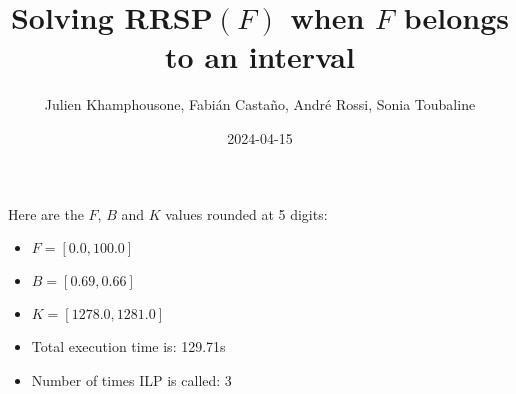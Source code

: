 \documentclass{article}
\begin{document}
     \title{Solving RRSP$(F)$ when $F$ belongs to an interval}
     \author{Julien Khamphousone, Fabi\'an Casta\~no, Andr\'e Rossi, Sonia Toubaline}
     \date{2024-04-15}
     \maketitle
     \def\F{{0.0,1.0,1.1}}
\def\gF{{12.78,13.47,1281.66}}

    Here are the $F$, $B$ and $K$ values rounded at 5 digits:

\begin{itemize}
	\item  $F = [0.0,100.0]$
 \item $B = [0.69,0.66]$
 \item  $K = [1278.0,1281.0]$\item Total execution time is: 129.71s\item Number of times ILP is called: 3\end{itemize}
\end{document}
